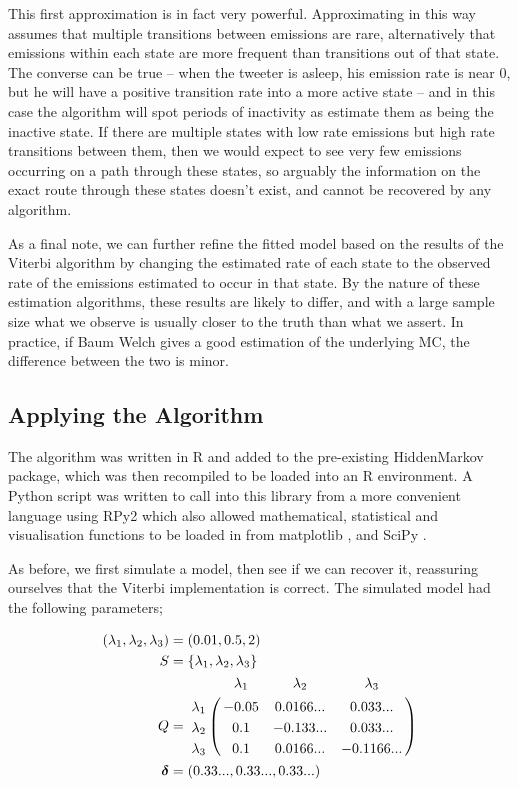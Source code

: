 This first approximation is in fact very powerful. Approximating in this way assumes that multiple transitions between emissions are rare, alternatively  that emissions within each state are more frequent than transitions out of that state. The converse can be true -- when the tweeter is asleep, his emission rate is near 0, but he will have a positive transition rate into a more active state -- and in this case the algorithm will spot periods of inactivity as estimate them as being the inactive state. If there are multiple states with low rate emissions but high rate transitions between them, then we would expect to see very few emissions occurring on a path through these states, so arguably the information on the exact route through these states doesn't exist, and cannot be recovered by any algorithm.

As a final note, we can further refine the fitted model based on the results of the Viterbi algorithm by changing the estimated rate of each state to the observed rate of the emissions estimated to occur in that state. By the nature of these estimation algorithms, these results are likely to differ, and with a large sample size what we observe is usually closer to the truth than what we assert. In practice, if Baum Welch gives a good estimation of the underlying MC, the difference between the two is minor.

\subsection{Applying the Algorithm}

The algorithm was written in R and added to the pre-existing HiddenMarkov \cite{hiddenmarkov} package, which was then recompiled to be loaded into an R environment. A Python script was written to call into this library from a more convenient language using RPy2 \cite{rpy} which also allowed mathematical, statistical and visualisation functions to be loaded in from matplotlib \cite{matplotlib}, and SciPy \cite{scipy}.

As before, we first simulate a model, then see if we can recover it, reassuring ourselves that the Viterbi implementation is correct. The simulated model had the following parameters;

\begin{align*}
(\lambda_1,\lambda_2,\lambda_3) &= (0.01,0.5,2)\\
S &= \{\lambda_1,\lambda_2,\lambda_3\}\\
Q &= \bordermatrix{      & \lambda_1 & \lambda_2 & \lambda_3\cr
                \lambda_1 & -0.05 & 0.0166...  & 0.033... \cr
                \lambda_2 & 0.1  & -0.133... & 0.033... \cr
                \lambda_3 & 0.1  & 0.0166...  & -0.1166...\cr
			}\\
\bm{\delta} &= \left(0.33...,0.33...,0.33...\right)
\end{align*}

